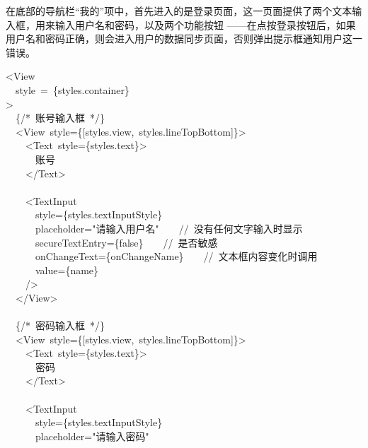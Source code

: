 \documentclass{article}
\begin{document}
在底部的导航栏“我的”项中，首先进入的是登录页面，这一页面提供了两个文本输入框，用来输入用户名和密码，以及两个功能按钮
——在点按登录按钮后，如果用户名和密码正确，则会进入用户的数据同步页面，否则弹出提示框通知用户这一错误。%
\begin{mdpre}%
\noindent\textless{}View\\
~~style~=~\{styles.container\}\\
\textgreater{}\\
~~\{{/*}{~账号输入框~}{*/}\}\\
~~\textless{}View~style=\{{}[styles.view,~styles.lineTopBottom]\}\textgreater{}\\
~~~~\textless{}Text~style=\{styles.text\}\textgreater{}\\
~~~~~~账号\\
~~~~\textless{}/Text\textgreater{}\\
\\
~~~~\textless{}TextInput\\
~~~~~~style=\{styles.textInputStyle\}\\
~~~~~~placeholder={"}{请输入用户名}{"}~~~~{//~没有任何文字输入时显示}\\
~~~~~~secureTextEntry=\{{false}\}~~~~{//~是否敏感}\\
~~~~~~onChangeText=\{onChangeName\}~~~~{//~文本框内容变化时调用}\\
~~~~~~value=\{name\}\\
~~~~/\textgreater{}\\
~~\textless{}/View\textgreater{}\\
\\
~~\{{/*}{~密码输入框~}{*/}\}\\
~~\textless{}View~style=\{{}[styles.view,~styles.lineTopBottom]\}\textgreater{}\\
~~~~\textless{}Text~style=\{styles.text\}\textgreater{}\\
~~~~~~密码\\
~~~~\textless{}/Text\textgreater{}\\
\\
~~~~\textless{}TextInput\\
~~~~~~style=\{styles.textInputStyle\}\\
~~~~~~placeholder={"}{请输入密码}{"}\\

\end{mdpre}
\end{document}
